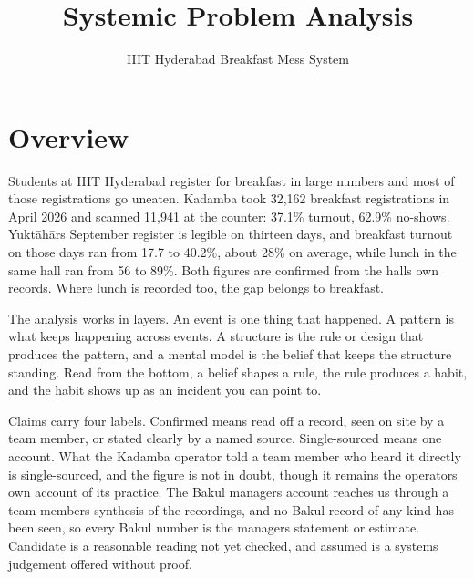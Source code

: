 \documentclass[
  10pt,
  table]{article}
\title{Systemic Problem Analysis}
\subtitle{IIIT Hyderabad Breakfast Mess System}
\author{}
\date{}
\makeatletter
\gdef\psubtitle{}
\renewcommand{\maketitle}{%
  \begingroup\raggedright
  {\color{pblue}\fontsize{24}{27}\selectfont\bfseries \@title\par}
  \vspace{3pt}{\color{pblue}\rule{\linewidth}{2.4pt}}\par\vspace{5pt}
  {\color{pslate}\large \psubtitle\par}
  \vspace{4pt}
  \endgroup}
\makeatother
\begin{document}
\maketitle

\renewcommand*\contentsname{Contents}
{
\hypersetup{linkcolor=pslate}
\setcounter{tocdepth}{2}
\tableofcontents
}
\section{Overview}\label{overview}

Students at IIIT Hyderabad register for breakfast in large numbers and most of those registrations go uneaten. Kadamba took 32,162 breakfast registrations in April 2026 and scanned 11,941 at the counter: 37.1\% turnout, 62.9\% no-shows. Yuktāhār\textquotesingle s September register is legible on thirteen days, and breakfast turnout on those days ran from 17.7 to 40.2\%, about 28\% on average, while lunch in the same hall ran from 56 to 89\%. Both figures are confirmed from the halls\textquotesingle{} own records. Where lunch is recorded too, the gap belongs to breakfast.

The analysis works in layers. An event is one thing that happened. A pattern is what keeps happening across events. A structure is the rule or design that produces the pattern, and a mental model is the belief that keeps the structure standing. Read from the bottom, a belief shapes a rule, the rule produces a habit, and the habit shows up as an incident you can point to.

Claims carry four labels. Confirmed means read off a record, seen on site by a team member, or stated clearly by a named source. Single-sourced means one account. What the Kadamba operator told a team member who heard it directly is single-sourced, and the figure is not in doubt, though it remains the operator\textquotesingle s own account of its practice. The Bakul manager\textquotesingle s account reaches us through a team member\textquotesingle s synthesis of the recordings, and no Bakul record of any kind has been seen, so every Bakul number is the manager\textquotesingle s statement or estimate. Candidate is a reasonable reading not yet checked, and assumed is a systems judgement offered without proof.
\end{document}

